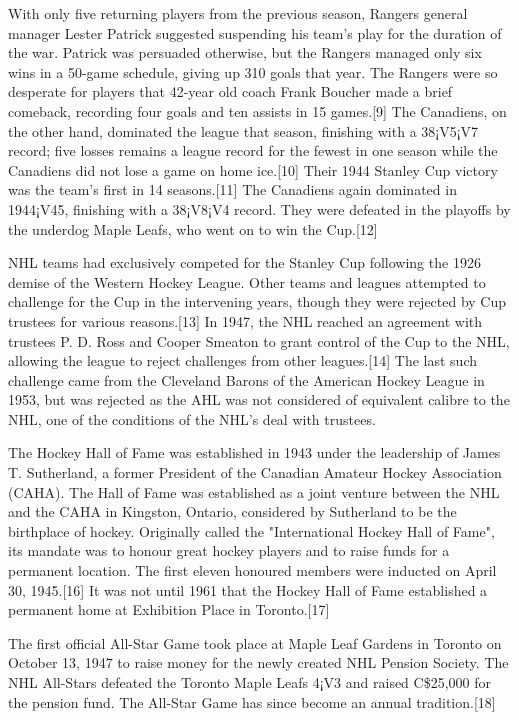 \documentclass[conference]{IEEEtran}
\begin{document}
With only five returning players from the previous season, Rangers
general manager Lester Patrick suggested suspending his team's play
for the duration of the war. Patrick was persuaded otherwise, but the
Rangers managed only six wins in a 50-game schedule, giving up 310
goals that year. The Rangers were so desperate for players that
42-year old coach Frank Boucher made a brief comeback, recording four
goals and ten assists in 15 games.[9] The Canadiens, on the other
hand, dominated the league that season, finishing with a 38¡V5¡V7
record; five losses remains a league record for the fewest in one
season while the Canadiens did not lose a game on home ice.[10] Their
1944 Stanley Cup victory was the team's first in 14 seasons.[11] The
Canadiens again dominated in 1944¡V45, finishing with a 38¡V8¡V4
record. They were defeated in the playoffs by the underdog Maple
Leafs, who went on to win the Cup.[12]

NHL teams had exclusively competed for the Stanley Cup following the
1926 demise of the Western Hockey League. Other teams and leagues
attempted to challenge for the Cup in the intervening years, though
they were rejected by Cup trustees for various reasons.[13] In 1947,
the NHL reached an agreement with trustees P. D. Ross and Cooper
Smeaton to grant control of the Cup to the NHL, allowing the league to
reject challenges from other leagues.[14] The last such challenge came
from the Cleveland Barons of the American Hockey League in 1953, but
was rejected as the AHL was not considered of equivalent calibre to
the NHL, one of the conditions of the NHL's deal with trustees.

The Hockey Hall of Fame was established in 1943 under the leadership
of James T. Sutherland, a former President of the Canadian Amateur
Hockey Association (CAHA). The Hall of Fame was established as a joint
venture between the NHL and the CAHA in Kingston, Ontario, considered
by Sutherland to be the birthplace of hockey. Originally called the
"International Hockey Hall of Fame", its mandate was to honour great
hockey players and to raise funds for a permanent location. The first
eleven honoured members were inducted on April 30, 1945.[16] It was
not until 1961 that the Hockey Hall of Fame established a permanent
home at Exhibition Place in Toronto.[17]

The first official All-Star Game took place at Maple Leaf Gardens in
Toronto on October 13, 1947 to raise money for the newly created NHL
Pension Society. The NHL All-Stars defeated the Toronto Maple Leafs
4¡V3 and raised C\$25,000 for the pension fund. The All-Star Game has
since become an annual tradition.[18]
\end{document}
